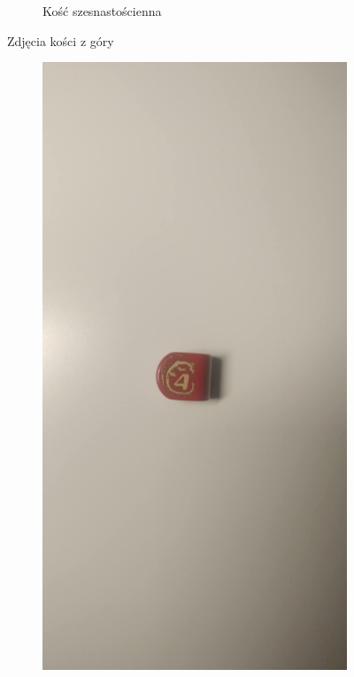 \begin{figure}[H]
\begin{subfigure}{.3\textwidth}
        \caption{\label{fig:k16}Kość szesnastościenna}
      \end{subfigure}
    \caption{Zdjęcia kości z góry}
\end{figure}

\begin{figure}[H]
    \centering
      \begin{subfigure}{.5\textwidth}
        \includegraphics[width=.9\linewidth, trim={250mm 200mm 350mm 150mm}, clip]{chapters/02-teoria/figures/modern_k4}

\end{subfigure}
\end{figure}
